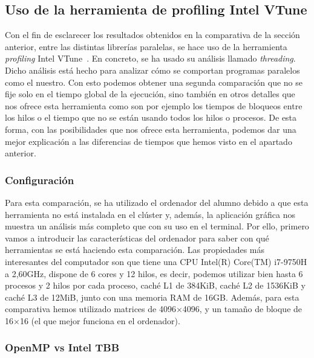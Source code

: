 \documentclass[a4paper,12pt]{article}
\begin{document}
\subsection{Uso de la herramienta de profiling Intel VTune}

Con el fin de esclarecer los resultados obtenidos en la comparativa de la sección anterior, entre las distintas librerías paralelas, se hace uso de la herramienta {\it profiling} Intel VTune~\cite{vtune}. En concreto, se ha usado su análisis llamado {\it threading}. Dicho análisis está hecho para analizar cómo se comportan programas paralelos como el nuestro. Con esto podemos obtener una segunda comparación que no se fije solo en el tiempo global de la ejecución, sino también en otros detalles que nos ofrece esta herramienta como son por ejemplo los tiempos de bloqueos entre los hilos o el tiempo que no se están usando todos los hilos o procesos. De esta forma, con las posibilidades que nos ofrece esta herramienta, podemos dar una mejor explicación a las diferencias de tiempos que hemos visto en el apartado anterior.

\subsubsection{Configuración}
Para esta comparación, se ha utilizado el ordenador del alumno debido a que esta herramienta no está instalada en el clúster y, además, la aplicación gráfica nos muestra un análisis más completo que con su uso en el terminal. Por ello, primero vamos a introducir las características del ordenador para saber con qué herramientas se está haciendo esta comparación. Las propiedades más interesantes del computador son que tiene una CPU Intel(R) Core(TM) i7-9750H a 2,60GHz, dispone de 6 cores y 12 hilos, es decir, podemos utilizar bien hasta 6 procesos y 2 hilos por cada proceso, caché L1 de 384KiB, caché L2 de 1536KiB y caché L3 de 12MiB, junto con una memoria RAM de 16GB. Además, para esta comparativa hemos utilizado matrices de 4096$\times$4096, y un tamaño de bloque de 16$\times$16 (el que mejor funciona en el ordenador).

\subsubsection{OpenMP vs Intel TBB}
\end{document}

